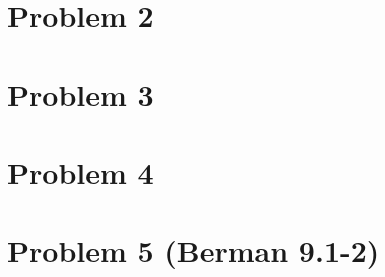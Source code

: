 \documentclass[12pt]{article}
\begin{document}
\section*{Problem 2}



\section*{Problem 3}



\section*{Problem 4}



\section*{Problem 5 (Berman 9.1-2)}

%
\end{document}
